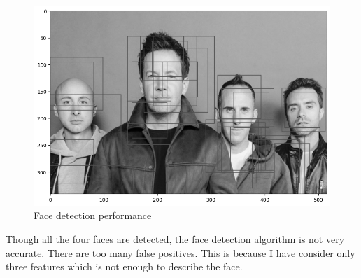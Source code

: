 \begin{figure}[H]
    \centering
    \includegraphics[width=.9\textwidth]{imgs/face_detected.png}
    \caption{Face detection performance}
    \label{fig:2_mediapipe}
\end{figure}


Though all the four faces are detected, the face detection algorithm is not very accurate. There are too many false positives. This is because I have consider only three features which is not enough to describe the face.

\newpage